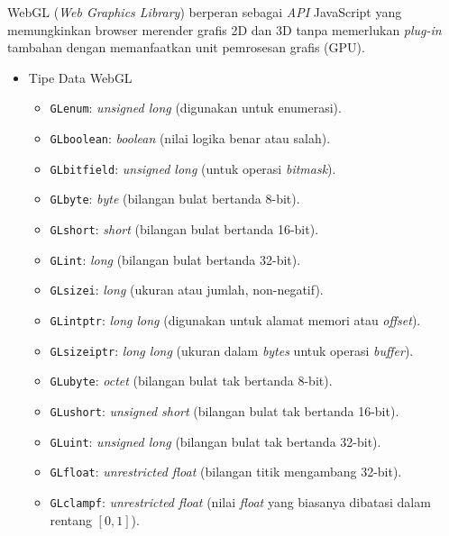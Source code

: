 \documentclass[a4paper,twoside]{article}
\begin{document}
\begin{enumerate}
            WebGL (\textit{Web Graphics Library}) berperan sebagai \textit{API} JavaScript yang memungkinkan browser merender grafis 2D dan 3D tanpa memerlukan \textit{plug-in }tambahan dengan memanfaatkan unit pemrosesan grafis (GPU). 
           \begin{itemize}
                \item{Tipe Data WebGL}
                \begin{itemize}
                    \item \texttt{GLenum}: \textit{unsigned long} (digunakan untuk enumerasi).
                    \item \texttt{GLboolean}: \textit{boolean} (nilai logika benar atau salah).
                    \item \texttt{GLbitfield}: \textit{unsigned long} (untuk operasi \textit{bitmask}).
                    \item \texttt{GLbyte}: \textit{byte} (bilangan bulat bertanda 8-bit).
                    \item \texttt{GLshort}: \textit{short} (bilangan bulat bertanda 16-bit).
                    \item \texttt{GLint}: \textit{long} (bilangan bulat bertanda 32-bit).
                    \item \texttt{GLsizei}: \textit{long} (ukuran atau jumlah, non-negatif).
                    \item \texttt{GLintptr}: \textit{long long} (digunakan untuk alamat memori atau \textit{offset}).
                    \item \texttt{GLsizeiptr}: \textit{long long} (ukuran dalam \textit{bytes} untuk operasi \textit{buffer}).
                    \item \texttt{GLubyte}: \textit{octet} (bilangan bulat tak bertanda 8-bit).
                    \item \texttt{GLushort}: \textit{unsigned short} (bilangan bulat tak bertanda 16-bit).
                    \item \texttt{GLuint}: \textit{unsigned long} (bilangan bulat tak bertanda 32-bit).
                    \item \texttt{GLfloat}: \textit{unrestricted float} (bilangan titik mengambang 32-bit).
                    \item \texttt{GLclampf}: \textit{unrestricted float} (nilai \textit{float} yang biasanya dibatasi dalam rentang $[0, 1]$).
                \end{itemize}
            

\end{itemize}
\end{enumerate}
\end{document}
